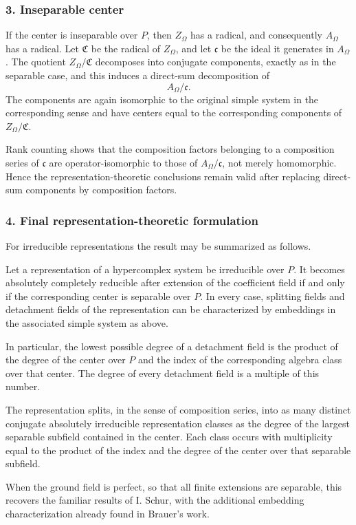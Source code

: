 \documentclass[11pt]{article}
\begin{document}
\subsubsection{3. Inseparable center}\label{inseparable-center}

If the center is inseparable over \(P\), then \(Z_\Omega\) has a
radical, and consequently \(A_\Omega\) has a radical. Let
\(\mathfrak C\) be the radical of \(Z_\Omega\), and let \(\mathfrak c\)
be the ideal it generates in \(A_\Omega\). The quotient
\(Z_\Omega/\mathfrak C\) decomposes into conjugate components, exactly
as in the separable case, and this induces a direct-sum decomposition of
\[
  A_\Omega/\mathfrak c.
\] The components are again isomorphic to the original simple system in
the corresponding sense and have centers equal to the corresponding
components of \(Z_\Omega/\mathfrak C\).

Rank counting shows that the composition factors belonging to a
composition series of \(\mathfrak c\) are operator-isomorphic to those
of \(A_\Omega/\mathfrak c\), not merely homomorphic. Hence the
representation-theoretic conclusions remain valid after replacing
direct-sum components by composition factors.

\subsubsection{4. Final representation-theoretic
formulation}\label{final-representation-theoretic-formulation}

For irreducible representations the result may be summarized as follows.

Let a representation of a hypercomplex system be irreducible over \(P\).
It becomes absolutely completely reducible after extension of the
coefficient field if and only if the corresponding center is separable
over \(P\). In every case, splitting fields and detachment fields of the
representation can be characterized by embeddings in the associated
simple system as above.

In particular, the lowest possible degree of a detachment field is the
product of the degree of the center over \(P\) and the index of the
corresponding algebra class over that center. The degree of every
detachment field is a multiple of this number.

The representation splits, in the sense of composition series, into as
many distinct conjugate absolutely irreducible representation classes as
the degree of the largest separable subfield contained in the center.
Each class occurs with multiplicity equal to the product of the index
and the degree of the center over that separable subfield.

When the ground field is perfect, so that all finite extensions are
separable, this recovers the familiar results of I. Schur, with the
additional embedding characterization already found in Brauer's work.
\end{document}
